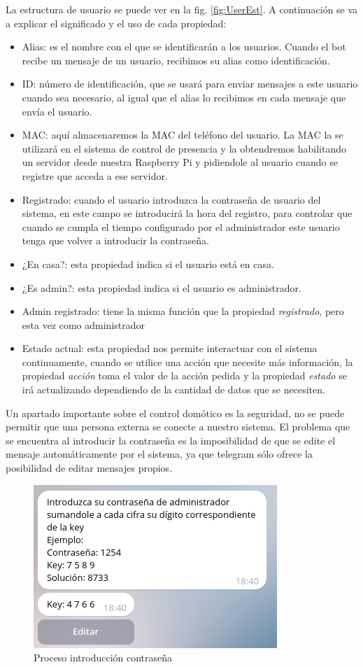 \documentclass[10pt,journal,compsoc]{IEEEtran}
\begin{document}
La estructura de  usuario se puede ver en la fig. \ref{fig:UserEst}. A continuación se va a explicar 
el significado y el uso de cada propiedad:
\begin{itemize}
\item Alias: es el nombre con el que se identificarán a los usuarios. Cuando el bot recibe un mensaje 
de un usuario, recibimos su alias como identificación.
\item ID: número de identificación, que se usará para enviar mensajes a este usuario cuando sea 
necesario, al igual que el alias lo recibimos en cada mensaje que envía el usuario.
\item MAC: aquí almacenaremos la MAC del teléfono del usuario. La MAC la se utilizará en el 
sistema de control de presencia y la obtendremos habilitando un servidor desde nuestra 
Raspberry Pi y pidiendole al usuario cuando se registre que acceda a ese servidor.
\item Registrado: cuando el usuario introduzca la contraseña de usuario del sistema, en 
este campo se introducirá la hora del registro, para controlar que cuando se cumpla el tiempo 
configurado por el administrador este usuario tenga que volver a introducir la contraseña.
\item ¿En casa?: esta propiedad indica si el usuario está en casa. 
\item ¿Es admin?: esta propiedad indica si el usuario es administrador.
\item Admin registrado: tiene la misma función que la propiedad \textit{registrado}, pero esta 
vez como administrador 
\item Estado actual: esta propiedad nos permite interactuar con el sistema continuamente, 
cuando se utilice una acción que necesite más información, la propiedad \textit{acción} toma 
el valor de la acción pedida y la propiedad \textit{estado} se irá actualizando dependiendo de 
la cantidad de datos que se necesiten.
\end{itemize}

Un apartado importante sobre el control domótico es la seguridad, no se puede permitir que 
una persona externa se conecte a nuestro sistema. El problema que se encuentra al introducir 
la contraseña es la imposibilidad de que se edite el mensaje automáticamente por el sistema, 
ya que telegram sólo ofrece la posibilidad de editar mensajes propios. 

\begin{figure}[h]
\centering
\includegraphics[scale=0.6]{imgPass}
\caption{Proceso introducción contraseña}
\label{fig:imgPass}
\end{figure}
\end{document}
